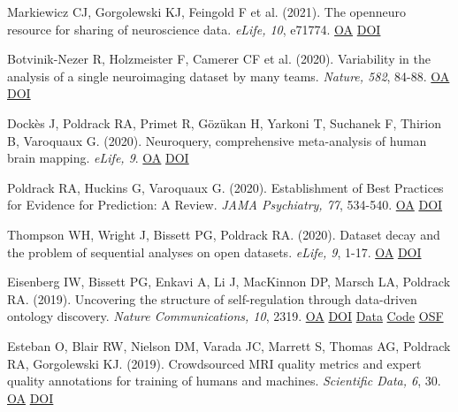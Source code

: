 \documentclass[10pt, letterpaper]{article}
\begin{document}
Markiewicz CJ, Gorgolewski KJ, Feingold F et al. (2021). The openneuro resource for sharing of neuroscience data. \textit{eLife, 10}, e71774. \href{https://www.ncbi.nlm.nih.gov/pmc/articles/PMC8550750}{OA} \href{https://doi.org/10.7554/elife.71774}{DOI} \vspace{2mm}

Botvinik-Nezer R, Holzmeister F, Camerer CF et al. (2020). Variability in the analysis of a single neuroimaging dataset by many teams. \textit{Nature, 582}, 84-88. \href{https://www.ncbi.nlm.nih.gov/pmc/articles/PMC7771346}{OA} \href{https://doi.org/10.1038/s41586-020-2314-9}{DOI} \vspace{2mm}

Dockès J, Poldrack RA, Primet R, Gözükan H, Yarkoni T, Suchanek F, Thirion B, Varoquaux G.  (2020). Neuroquery, comprehensive meta-analysis of human brain mapping. \textit{eLife, 9}. \href{https://www.ncbi.nlm.nih.gov/pmc/articles/PMC7164961}{OA} \href{https://doi.org/10.7554/elife.53385}{DOI} \vspace{2mm}

Poldrack RA, Huckins G, Varoquaux G.  (2020). Establishment of Best Practices for Evidence for Prediction: A Review. \textit{JAMA Psychiatry, 77}, 534-540. \href{https://www.ncbi.nlm.nih.gov/pmc/articles/PMC7250718}{OA} \href{https://doi.org/10.1001/jamapsychiatry.2019.3671}{DOI} \vspace{2mm}

Thompson WH, Wright J, Bissett PG, Poldrack RA.  (2020). Dataset decay and the problem of sequential analyses on open datasets. \textit{eLife, 9}, 1-17. \href{https://www.ncbi.nlm.nih.gov/pmc/articles/PMC7237204}{OA} \href{https://doi.org/10.7554/elife.53498}{DOI} \vspace{2mm}

Eisenberg IW, Bissett PG, Enkavi A, Li J, MacKinnon DP, Marsch LA, Poldrack RA.  (2019). Uncovering the structure of self-regulation through data-driven ontology discovery. \textit{Nature Communications, 10}, 2319. \href{https://www.ncbi.nlm.nih.gov/pmc/articles/PMC6534563}{OA} \href{https://doi.org/10.1038/s41467-019-10301-1}{DOI} \href{https://github.com/IanEisenberg/Self_Regulation_Ontology/tree/master/Data}{Data} \href{https://github.com/IanEisenberg/Self_Regulation_Ontology}{Code} \href{https://osf.io/zk6w9/}{OSF} \vspace{2mm}

Esteban O, Blair RW, Nielson DM, Varada JC, Marrett S, Thomas AG, Poldrack RA, Gorgolewski KJ.  (2019). Crowdsourced MRI quality metrics and expert quality annotations for training of humans and machines. \textit{Scientific Data, 6}, 30. \href{https://www.ncbi.nlm.nih.gov/pmc/articles/PMC6472378}{OA} \href{https://doi.org/10.1038/s41597-019-0035-4}{DOI} \vspace{2mm}
\end{document}
